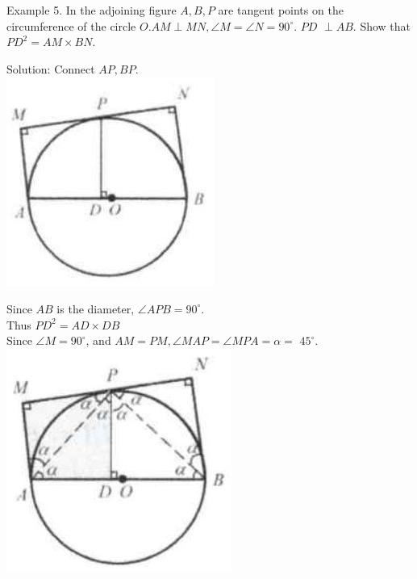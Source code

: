 \documentclass[10pt]{article}
\begin{document}
Example 5. In the adjoining figure \(A, B, P\) are tangent points on the circumference of the circle \(O . A M \perp M N, \angle M=\angle N=90^{\circ}\). \(P D\) \(\perp A B\). Show that \(P D^{2}=A M \times B N\).

Solution:
Connect \(A P, B P\).\\
\includegraphics[max width=\textwidth, center]{2025_04_17_97bc1f7e44d93c271a88g-148(5)}

Since \(A B\) is the diameter, \(\angle A P B=90^{\circ}\).\\
Thus \(P D^{2}=A D \times D B\)\\
Since \(\angle M=90^{\circ}\), and \(A M=P M, \angle M A P=\angle M P A=\alpha=\) \(45^{\circ}\).\\
\includegraphics[max width=\textwidth, center]{2025_04_17_97bc1f7e44d93c271a88g-148}
\end{document}
